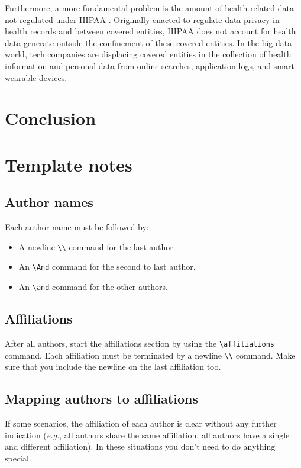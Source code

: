 \documentclass{article}
\begin{document}
Furthermore, a more fundamental problem is the amount of health related data not regulated under HIPAA \cite{price_privacy_2019}. 
Originally enacted to regulate data privacy in health records and between covered entities, HIPAA does not account for health data generate outside the confinement of these covered entities. 
In the big data world, tech companies are displacing covered entities in the collection of health information and personal data from online searches, application logs, and smart wearable devices.

\section{Conclusion}

\section{Template notes}

\subsection{Author names}

Each author name must be followed by:
\begin{itemize}
    \item A newline {\tt \textbackslash{}\textbackslash{}} command for the last author.
    \item An {\tt \textbackslash{}And} command for the second to last author.
    \item An {\tt \textbackslash{}and} command for the other authors.
\end{itemize}

\subsection{Affiliations}

After all authors, start the affiliations section by using the {\tt \textbackslash{}affiliations} command.
Each affiliation must be terminated by a newline {\tt \textbackslash{}\textbackslash{}} command. Make sure that you include the newline on the last affiliation too.

\subsection{Mapping authors to affiliations}

If some scenarios, the affiliation of each author is clear without any further indication (\emph{e.g.}, all authors share the same affiliation, all authors have a single and different affiliation). In these situations you don't need to do anything special.
\end{document}
